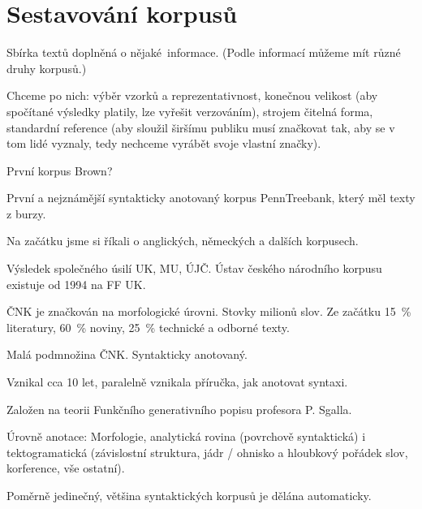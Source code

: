\documentclass[12pt]{article}					%
\begin{document}
\section{Sestavování korpusů}
\begin{definice}[Korpus]
	Sbírka textů doplněná o nějaké informace. (Podle informací můžeme mít různé druhy korpusů.)

	Chceme po nich: výběr vzorků a reprezentativnost, konečnou velikost (aby spočítané výsledky platily, lze vyřešit verzováním), strojem čitelná forma, standardní reference (aby sloužil širšímu publiku musí značkovat tak, aby se v tom lidé vyznaly, tedy nechceme vyrábět svoje vlastní značky).

	\begin{prikladyin}
		První korpus Brown?

		První a nejznámější syntakticky anotovaný korpus PennTreebank, který měl texty z burzy.
	\end{prikladyin}
\end{definice}


\begin{poznamka}
	Na začátku jsme si říkali o anglických, německých a dalších korpusech.
\end{poznamka}

\begin{definice}
	Výsledek společného úsilí UK, MU, ÚJČ. Ústav českého národního korpusu existuje od 1994 na FF UK.

	ČNK je značkován na morfologické úrovni. Stovky milionů slov. Ze začátku 15~\% literatury, 60~\% noviny, 25~\% technické a odborné texty.
\end{definice}

\begin{definice}
	Malá podmnožina ČNK. Syntakticky anotovaný.

	Vznikal cca 10 let, paralelně vznikala příručka, jak anotovat syntaxi.

	Založen na teorii Funkčního generativního popisu profesora P. Sgalla.

	Úrovně anotace: Morfologie, analytická rovina (povrchově syntaktická) i tektogramatická (závislostní struktura, jádr / ohnisko a hloubkový pořádek slov, korference, vše ostatní).

	Poměrně jedinečný, většina syntaktických korpusů je dělána automaticky.
\end{definice}
\end{document}
